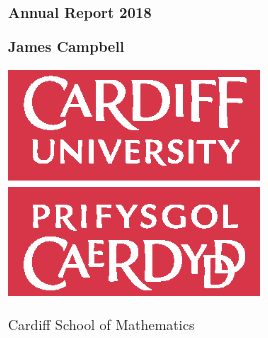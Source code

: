 
\begin{titlepage}
    \begin{center}
        \vspace*{2cm}

        \textbf{Annual Report 2018}

        \vspace{1.5cm}

        \textbf{James Campbell}
        \vspace{1.5cm}

        \includegraphics[width=0.5\textwidth]{./img/universitylogo.eps}

        \vfill



        \vspace{0.5cm}
        Cardiff School of Mathematics

        \vspace{1.5cm}



    \end{center}
\end{titlepage}